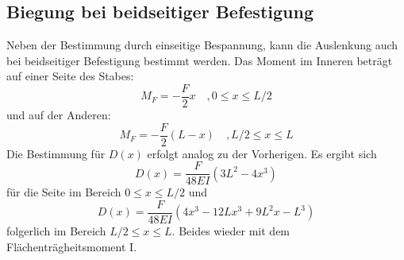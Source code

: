 \subsection{Biegung bei beidseitiger Befestigung}
Neben der Bestimmung durch einseitige Bespannung, kann die Auslenkung auch bei
beidseitiger Befestigung bestimmt werden. Das Moment im Inneren beträgt auf einer
Seite des Stabes:
\begin{equation}
    M_F = -\frac{F}{2} x \quad , 0 \leq x \leq L/2
\end{equation}
und auf der Anderen:
\begin{equation}
    M_F = -\frac{F}{2} (L-x) \quad , L/2 \leq x \leq L
\end{equation}
Die Bestimmung für $D(x)$ erfolgt analog zu der Vorherigen. Es ergibt sich
\begin{equation}
    D(x)=\frac{F}{48EI} (3L^2-4x^3)
\end{equation}
für die Seite im Bereich $0 \leq x \leq L/2$ und 
\begin{equation}
    D(x)=\frac{F}{48EI} (4x^3-12Lx^3+9L^2x-L^3)
\end{equation}
folgerlich im Bereich $L/2 \leq x \leq L$. Beides wieder mit dem Flächenträgheitsmoment I.


\cite{sample}
